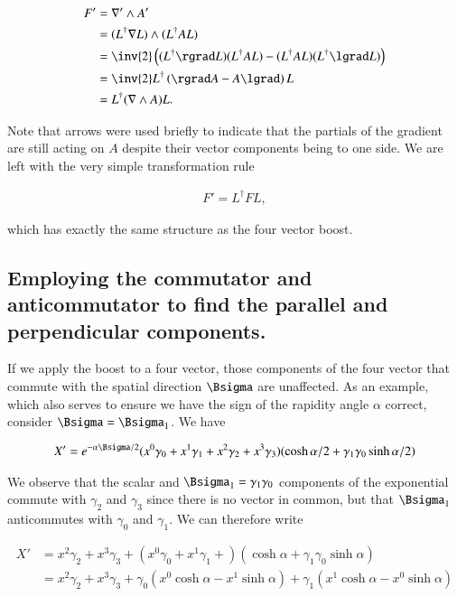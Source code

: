 \begin{align*}
F' 
&= \grad' \wedge A' \\
&= (L^\dagger \grad L) \wedge (L^\dagger A L) \\
&= \inv{2} \left(
(L^\dagger \rgrad L) (L^\dagger A L) 
-
(L^\dagger A L) (L^\dagger \lgrad L)
\right) \\
&= \inv{2} L^\dagger \left( \rgrad A - A \lgrad \right) L  \\
&= L^\dagger (\grad \wedge A) L.
\end{align*}

Note that arrows were used briefly to indicate that the partials of the gradient are still acting on $A$ despite their vector components being to one side.  We are left with the very simple transformation rule

\begin{align}\label{eqn:boostCommutator:2}
F' = L^\dagger F L,
\end{align}

which has exactly the same structure as the four vector boost.

\subsection{Employing the commutator and anticommutator to find the parallel and perpendicular components.}

If we apply the boost to a four vector, those components of the four vector that commute with the spatial direction $\Bsigma$ are unaffected.  As an example, which also serves to ensure we have the sign of the rapidity angle $\alpha$ correct, consider $\Bsigma = \Bsigma_1$.  We have

\begin{align}\label{eqn:boostCommutator:3}
X' = 
e^{-\alpha \Bsigma/2} ( 
x^0 \gamma_0 + 
x^1 \gamma_1 + 
x^2 \gamma_2 + 
x^3 \gamma_3 ) (\cosh \alpha/2 + \gamma_1 \gamma_0 \sinh \alpha/2 )
\end{align}

We observe that the scalar and $\Bsigma_1 = \gamma_1 \gamma_0$ components of the exponential commute with $\gamma_2$ and $\gamma_3$ since there is no vector in common, but that $\Bsigma_1$ anticommutes with $\gamma_0$ and $\gamma_1$.  We can therefore write

\begin{align*}
X' 
&= 
x^2 \gamma_2 + 
x^3 \gamma_3 
+( 
x^0 \gamma_0 + 
x^1 \gamma_1 + 
) (\cosh \alpha + \gamma_1 \gamma_0 \sinh \alpha ) \\
&= 
x^2 \gamma_2 + 
x^3 \gamma_3 
+
\gamma_0 ( x^0 \cosh\alpha - x^1 \sinh \alpha )
+ 
\gamma_1 ( x^1 \cosh\alpha - x^0 \sinh \alpha )
\end{align*}

